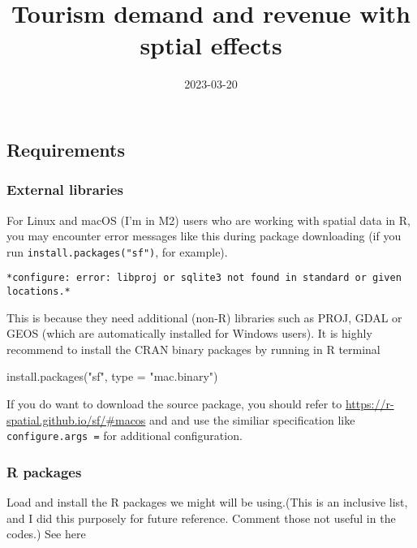 \documentclass[
]{article}
\title{Tourism demand and revenue with sptial effects}
\author{}
\date{\vspace{-2.5em}2023-03-20}
\newenvironment{Shaded}{\begin{snugshade}}{\end{snugshade}}
\newcommand{\AttributeTok}[1]{\textcolor[rgb]{0.77,0.63,0.00}{#1}}
\newcommand{\FunctionTok}[1]{\textcolor[rgb]{0.00,0.00,0.00}{#1}}
\newcommand{\NormalTok}[1]{#1}
\newcommand{\StringTok}[1]{\textcolor[rgb]{0.31,0.60,0.02}{#1}}
\begin{document}
\maketitle

\hypertarget{requirements}{%
\subsection{Requirements}\label{requirements}}

\hypertarget{external-libraries}{%
\subsubsection{External libraries}\label{external-libraries}}

For Linux and macOS (I'm in M2) users who are working with spatial data
in R, you may encounter error messages like this during package
downloading (if you run \texttt{install.packages("sf")}, for example).

\begin{verbatim}
*configure: error: libproj or sqlite3 not found in standard or given locations.*
\end{verbatim}

This is because they need additional (non-R) libraries such as PROJ,
GDAL or GEOS (which are automatically installed for Windows users). It
is highly recommend to install the CRAN binary packages by running in R
terminal

\begin{Shaded}
\begin{Highlighting}[]
\FunctionTok{install.packages}\NormalTok{(}\StringTok{"sf"}\NormalTok{, }\AttributeTok{type =} \StringTok{"mac.binary"}\NormalTok{)}
\end{Highlighting}
\end{Shaded}

If you do want to download the source package, you should refer to
\url{https://r-spatial.github.io/sf/\#macos} and and use the similiar
specification like \texttt{configure.args\ =} for additional
configuration.

\hypertarget{r-packages}{%
\subsubsection{R packages}\label{r-packages}}

Load and install the R packages we might will be using.(This is an
inclusive list, and I did this purposely for future reference. Comment
those not useful in the codes.) See here
\end{document}
